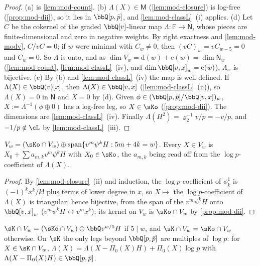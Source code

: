 \begin{proof}
(a) is \cref{lem:mod-count}. (b) $\Lambda(X)\in\mathsf M$ (\cref{lem:mod-closure}) is log-free (\cref{prop:mod-dii}), so it lies in $\bbQ[p,\bar p]$, and \cref{lem:mod-classL}~(i) applies. (d) Let $C$ be the cokernel of the graded $\bbQ[v]$-linear map $\Lambda\colon\mathbb F\to\mathsf N$, whose pieces are finite-dimensional and zero in negative weights. By right exactness and \cref{lem:mod-modv}, $C/vC=0$; if $w$ were minimal with $C_w\neq 0$, then $(vC)_w=vC_{w-5}=0$ and $C_w=0$. So $\Lambda$ is onto, and as $\dim V_w=\mathrm d(w)+\mathrm e(w)=\dim\mathsf N_w$ (\cref{lem:mod-count}, \cref{lem:mod-classL}~(iv), and $\dim\bbQ[v,x]_w=\mathrm e(w)$), $\Lambda_w$ is bijective. (c) By (b) and \cref{lem:mod-classL}~(iv) the map is well defined. If $\Lambda(X)\in\bbQ(v)[x]$, then $\Lambda(X)\in\bbQ[v,x]$ (\cref{lem:mod-classL}~(ii)), so $\Lambda(X)=0$ in $\mathsf N$ and $X=0$ by (d). Given $\phi\in(\bbQ[p,\bar p]/\bbQ[v,x])_w$, $X:=\Lambda^{-1}(\phi\oplus 0)$ has a log-free leg, so $X\in\sKo$ (\cref{prop:mod-dii}). The dimensions are \cref{lem:mod-classL}~(iv). Finally $\Lambda(H^2)=\varrho_2^{-1}v/p=-v/p$, and $-1/p\notin\cL$ by \cref{lem:mod-classL}~(iii).
\end{proof}

\begin{cor}[Splitting of $V_w$]
\label{cor:mod-split}
$V_w=(\sKo\cap V_w)\oplus\operatorname{span}\{v^m\psi^kH:5m+4k=w\}$. Every $X\in V_w$ is $X_0+\sum a_{m,k}v^m\psi^kH$ with $X_0\in\sKo$, the $a_{m,k}$ being read off from the $\log p$-coefficient of $\Lambda(X)$.
\end{cor}

\begin{proof}
By \cref{lem:mod-closure}~(ii) and induction, the $\log p$-coefficient of $\phi^1_k$ is $(-1)^kx^k/k!$ plus terms of lower degree in $x$, so $X\mapsto$ the $\log p$-coefficient of $\Lambda(X)$ is triangular, hence bijective, from the span of the $v^m\psi^kH$ onto $\bbQ[v,x]_w$ ($v^m\psi^kH\leftrightarrow v^mx^k$); its kernel on $V_w$ is $\sKo\cap V_w$ by \cref{prop:mod-dii}.
\end{proof}

\begin{cor}
\label{cor:mod-Ksplit}
$\sK\cap V_w=(\sKo\cap V_w)\oplus\bbQ v^{w/5}H$ if $5\mid w$, and $\sK\cap V_w=\sKo\cap V_w$ otherwise. On $\sK$ the only legs beyond $\bbQ[p,\bar p]$ are multiples of $\log p$: for $X\in\sK\cap V_w$, $\Lambda(X)=\Lambda(X-\Pi_0(X)H)+\Pi_0(X)\log p$ with $\Lambda(X-\Pi_0(X)H)\in\bbQ[p,\bar p]$.
\end{cor}

